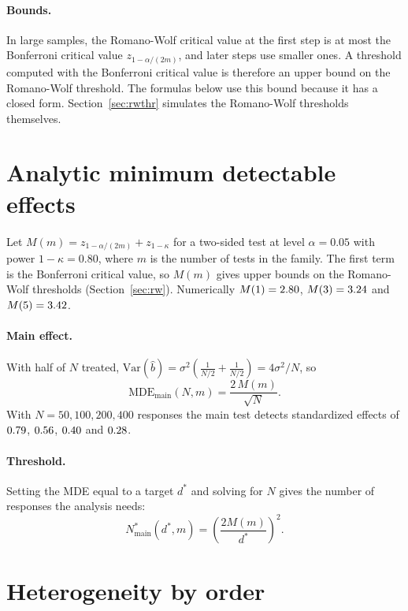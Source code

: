 \documentclass[11pt]{article}
\begin{document}
\paragraph{Bounds.} In large samples, the Romano-Wolf critical value at the first step is at most
the Bonferroni critical value $z_{1-\alpha/(2m)}$, and later steps use smaller ones. A threshold
computed with the Bonferroni critical value is therefore an upper bound on the Romano-Wolf
threshold. The formulas below use this bound because it has a closed form. Section~\ref{sec:rwthr}
simulates the Romano-Wolf thresholds themselves.

\section{Analytic minimum detectable effects}

Let $M(m) = z_{1-\alpha/(2m)} + z_{1-\kappa}$ for a two-sided test at level $\alpha = 0.05$ with power
$1-\kappa = 0.80$, where $m$ is the number of tests in the family. The first term is the
Bonferroni critical value, so $M(m)$ gives upper bounds on the Romano-Wolf thresholds
(Section~\ref{sec:rw}). Numerically $M(1) = 2.80$, $M(3) = 3.24$ and $M(5) = 3.42$.

\paragraph{Main effect.} With half of $N$ treated,
$\mathrm{Var}(\hat b) = \sigma^2 \left(\frac{1}{N/2} + \frac{1}{N/2}\right) = 4\sigma^2/N$, so
\begin{equation}
  \mathrm{MDE}_{\text{main}}(N, m) = \frac{2\,M(m)}{\sqrt{N}}. \label{eq:mde-main}
\end{equation}
With $N = 50, 100, 200, 400$ responses the main test detects standardized effects of
$0.79$, $0.56$, $0.40$ and $0.28$.

\paragraph{Threshold.} Setting the MDE equal to a target $d^{*}$ and solving for $N$ gives the
number of responses the analysis needs:
\begin{equation}
  N^{*}_{\text{main}}(d^{*}, m) = \left(\frac{2M(m)}{d^{*}}\right)^{2}. \label{eq:nstar}
\end{equation}

\section{Heterogeneity by order}\label{sec:het}
\end{document}
